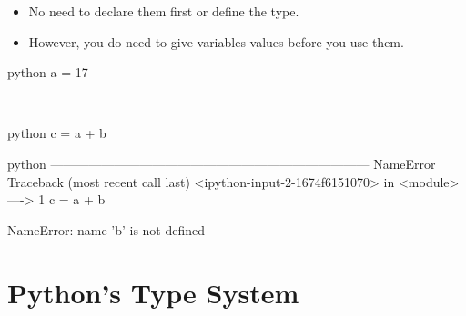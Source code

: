 \documentclass[aspectratio=1610,slidestop]{beamer}
\begin{document}
\begin{pframe}
 \vspace{-0.75cm}
 \begin{itemize}
  \item No need to declare them first or define the type.
  \item However, you do need to give variables values before you use them.
 \end{itemize}

 \begin{ipython}
  \begin{pythonin}{python}
a = 17
  \end{pythonin}
  \\
  \begin{pythonin}{python}
c = a + b
  \end{pythonin}
  \begin{pythonerr}{python}
---------------------------------------------------------------------------
NameError                                 Traceback (most recent call last)
<ipython-input-2-1674f6151070> in <module>
----> 1 c = a + b

NameError: name 'b' is not defined
  \end{pythonerr}
 \end{ipython}
\end{pframe}


\section{Python's Type System}
\end{document}

